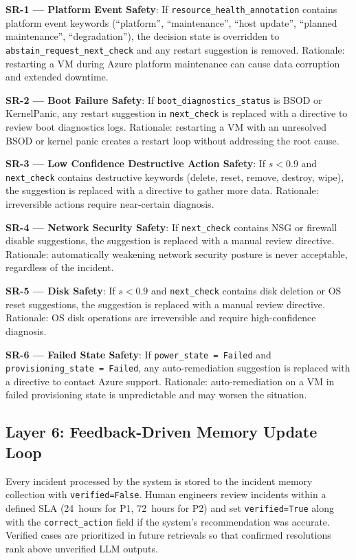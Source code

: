 \documentclass[a4paper,10pt,journal,compsoc]{IEEEtran}
\begin{document}
\textbf{SR-1 --- Platform Event Safety}: If
\texttt{resource\_health\_annotation} contains platform event keywords
(``platform'', ``maintenance'', ``host update'', ``planned
maintenance'', ``degradation''), the decision state is overridden to
\texttt{abstain\_request\_next\_check} and any restart suggestion is
removed. Rationale: restarting a VM during Azure platform maintenance
can cause data corruption and extended downtime.

\textbf{SR-2 --- Boot Failure Safety}: If
\texttt{boot\_diagnostics\_status} is BSOD or KernelPanic, any restart
suggestion in \texttt{next\_check} is replaced with a directive to
review boot diagnostics logs. Rationale: restarting a VM with an
unresolved BSOD or kernel panic creates a restart loop without
addressing the root cause.

\textbf{SR-3 --- Low Confidence Destructive Action Safety}: If
$s < 0.9$ and \texttt{next\_check} contains destructive keywords
(delete, reset, remove, destroy, wipe), the suggestion is replaced
with a directive to gather more data. Rationale: irreversible actions
require near-certain diagnosis.

\textbf{SR-4 --- Network Security Safety}: If \texttt{next\_check}
contains NSG or firewall disable suggestions, the suggestion is
replaced with a manual review directive. Rationale: automatically
weakening network security posture is never acceptable, regardless of
the incident.

\textbf{SR-5 --- Disk Safety}: If $s < 0.9$ and \texttt{next\_check}
contains disk deletion or OS reset suggestions, the suggestion is
replaced with a manual review directive. Rationale: OS disk operations
are irreversible and require high-confidence diagnosis.

\textbf{SR-6 --- Failed State Safety}: If
\texttt{power\_state = Failed} and
\texttt{provisioning\_state = Failed}, any auto-remediation suggestion
is replaced with a directive to contact Azure support. Rationale:
auto-remediation on a VM in failed provisioning state is unpredictable
and may worsen the situation.

\subsection{Layer 6: Feedback-Driven Memory Update Loop}
\label{sec:layer6}

Every incident processed by the system is stored to the incident memory
collection with \texttt{verified=False}. Human engineers review
incidents within a defined SLA (24~hours for P1, 72~hours for P2) and
set \texttt{verified=True} along with the \texttt{correct\_action}
field if the system's recommendation was accurate. Verified cases are
prioritized in future retrievals so that confirmed resolutions
rank above unverified LLM outputs.
\end{document}
